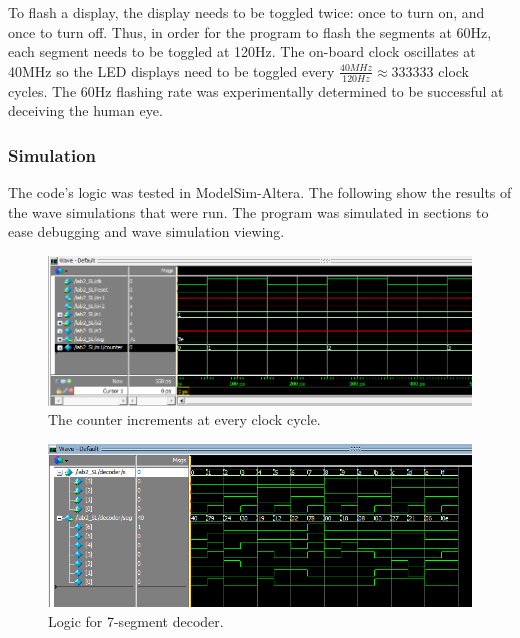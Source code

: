 \documentclass[11pt]{article}
\begin{document}
To flash a display, the display needs to be toggled twice: once to turn on, and once to turn off. Thus, in order for the program to flash the segments at 60Hz, each segment needs to be toggled at 120Hz. The on-board clock oscillates at 40MHz so the LED displays need to be toggled every $\frac{40MHz}{120Hz} \approx 333333$ clock cycles. The 60Hz flashing rate was experimentally determined to be successful at deceiving the human eye.


\label{sec:software_LEDbar}

\clearpage


\subsubsection{Simulation}

The code's logic was tested in ModelSim-Altera. The following show the results of the wave simulations that were run. The program was simulated in sections to ease debugging and wave simulation viewing.

\begin{figure}[h!]
\centering
\includegraphics[scale=0.65]{clk_works.png}
\caption{The counter increments at every clock cycle.}
\label{fig:wave_clk}
\end{figure} 


\begin{figure}[h!]
\centering
\includegraphics[scale=0.7]{mux_all.png}
\caption{Logic for 7-segment decoder.}
\label{fig:wave_mux}
\end{figure} 
\end{document}
